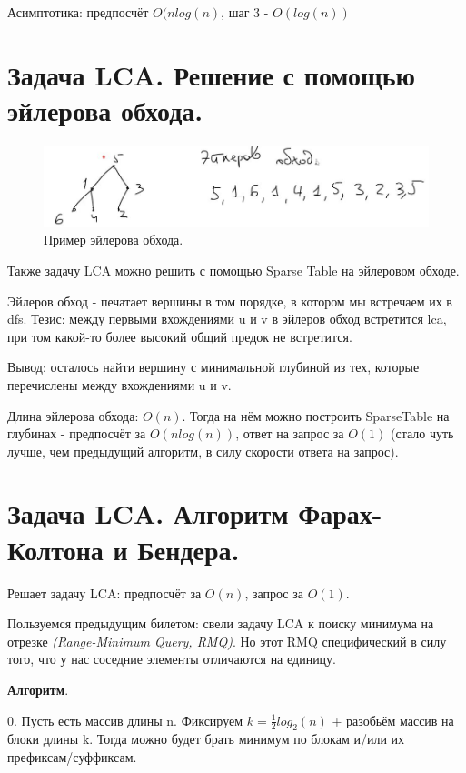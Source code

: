 Асимптотика: предпосчёт $O(n log(n)$, шаг 3 - $O(log (n))$
\newpage

\setcounter{section}{96}
\section{Задача LCA. Решение с помощью эйлерова обхода. }

\begin{figure}[!htb]
   \begin{minipage}{\textwidth}
     \centering
     \includegraphics[height = 2 cm]{images/96-99_euler}
     \caption{Пример эйлерова обхода.}
   \end{minipage}\hfill
\end{figure}

Также задачу LCA можно решить с помощью Sparse Table на эйлеровом обходе.

Эйлеров обход - печатает вершины в том порядке, в котором мы встречаем их в dfs. Тезис: между первыми вхождениями u и v в эйлеров обход встретится lca, при том какой-то более высокий общий предок не встретится.

Вывод: осталось найти вершину с минимальной глубиной из тех, которые перечислены между вхождениями u и v.

Длина эйлерова обхода: $O(n)$. Тогда на нём можно построить SparseTable на глубинах - предпосчёт за $O(n log(n))$, ответ на запрос за $O(1)$ (стало чуть лучше, чем предыдущий алгоритм, в силу скорости ответа на запрос).

\setcounter{section}{97}
\section{Задача LCA. Алгоритм Фарах-Колтона и Бендера.}

Решает задачу LCA: предпосчёт за $O(n)$, запрос за $O(1)$.

Пользуемся предыдущим билетом: свели задачу LCA к поиску минимума на отрезке \textit{(Range-Minimum Query, RMQ)}. Но этот RMQ специфический в силу того, что у нас соседние элементы отличаются на единицу.

\textbf{Алгоритм}. 

0. Пусть есть массив длины n. Фиксируем $k = \frac{1}{2} log_2(n)$ + разобьём массив на блоки длины k. Тогда можно будет брать минимум по блокам и/или их префиксам/суффиксам.

